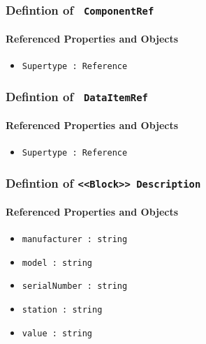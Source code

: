 \subsubsection{Defintion of \texttt{ ComponentRef}}
  \label{type:ComponentRef}

\FloatBarrier



\FloatBarrier
\paragraph{Referenced Properties and Objects}

\begin{itemize}
\item \texttt{Supertype : Reference}

\end{itemize}
\FloatBarrier
\subsubsection{Defintion of \texttt{ DataItemRef}}
  \label{type:DataItemRef}

\FloatBarrier



\FloatBarrier
\paragraph{Referenced Properties and Objects}

\begin{itemize}
\item \texttt{Supertype : Reference}

\end{itemize}
\FloatBarrier
\subsubsection{Defintion of \texttt{<<Block>> Description}}
  \label{type:Description}

\FloatBarrier



\FloatBarrier
\paragraph{Referenced Properties and Objects}

\begin{itemize}
\item \texttt{manufacturer : string}

\item \texttt{model : string}

\item \texttt{serialNumber : string}

\item \texttt{station : string}

\item \texttt{value : string}

\end{itemize}
\FloatBarrier
